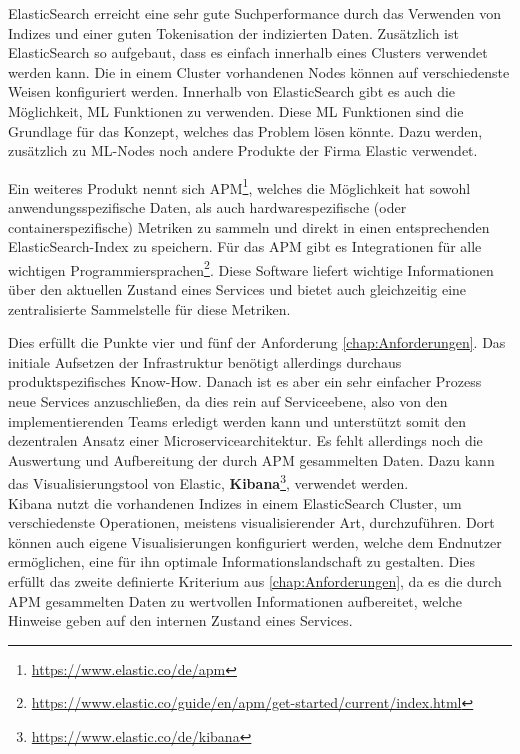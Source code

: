 ElasticSearch erreicht eine sehr gute Suchperformance durch das Verwenden von Indizes und einer guten Tokenisation der indizierten Daten. Zusätzlich ist ElasticSearch so aufgebaut, dass es einfach innerhalb eines Clusters verwendet werden kann. Die in einem Cluster vorhandenen Nodes können auf verschiedenste Weisen konfiguriert werden. Innerhalb von ElasticSearch gibt es auch die Möglichkeit, \ac{ML} Funktionen zu verwenden. Diese \ac{ML} Funktionen sind die Grundlage für das Konzept, welches das Problem lösen könnte. Dazu werden, zusätzlich zu \ac{ML}-Nodes noch andere Produkte der Firma Elastic verwendet.

Ein weiteres Produkt nennt sich \ac{APM}\footnote{\url{https://www.elastic.co/de/apm}}, welches die Möglichkeit hat sowohl anwendungsspezifische Daten, als auch hardwarespezifische (oder containerspezifische) Metriken zu sammeln und direkt in einen entsprechenden ElasticSearch-Index zu speichern. Für das \ac{APM} gibt es Integrationen für alle wichtigen Programmiersprachen\footnote{\url{https://www.elastic.co/guide/en/apm/get-started/current/index.html}}. Diese Software liefert wichtige Informationen über den aktuellen Zustand eines Services und bietet auch gleichzeitig eine zentralisierte Sammelstelle für diese Metriken. 

Dies erfüllt die Punkte vier und fünf der Anforderung \vref{chap:Anforderungen}. Das initiale Aufsetzen der Infrastruktur benötigt allerdings durchaus produktspezifisches Know-How. Danach ist es aber ein sehr einfacher Prozess neue Services anzuschließen, da dies rein auf Serviceebene, also von den implementierenden Teams erledigt werden kann und unterstützt somit den dezentralen Ansatz einer Microservicearchitektur. Es fehlt allerdings noch die Auswertung und Aufbereitung der durch \ac{APM} gesammelten Daten. Dazu kann das Visualisierungstool von Elastic, \textbf{Kibana}\footnote{\url{https://www.elastic.co/de/kibana}}, verwendet werden. \\
Kibana nutzt die vorhandenen Indizes in einem ElasticSearch Cluster, um verschiedenste Operationen, meistens visualisierender Art, durchzuführen. Dort können auch eigene Visualisierungen konfiguriert werden, welche dem Endnutzer ermöglichen, eine für ihn optimale Informationslandschaft zu gestalten. Dies erfüllt das zweite definierte Kriterium aus \vref{chap:Anforderungen}, da es die durch \ac{APM} gesammelten Daten zu wertvollen Informationen aufbereitet, welche Hinweise geben auf den internen Zustand eines Services.

